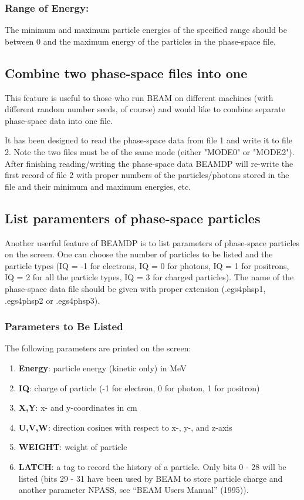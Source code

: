 \documentclass[12pt,twoside]{article}
\begin{document}
\subsubsection{Range of Energy:}
The minimum and maximum particle energies of the specified range
should be between 0 and the maximum energy of the particles in the
phase-space file.

\subsection{Combine two phase-space files into one}

This feature is useful to those who run BEAM on different machines (with
different random number seeds, of course) and would like to combine
separate phase-space data into one file.


It has been designed to read the phase-space data from file 1 and write it
to file 2. Note the two files must be of the same mode (either "MODE0" or
"MODE2"). After finishing reading/writing the phase-space data BEAMDP will
re-write the  first record of file 2 with proper numbers of the
particles/photons stored in the file and their minimum and maximum
energies, etc.

\subsection{ List paramenters of phase-space particles}
Another userful feature of BEAMDP is to list parameters of phase-space
particles on the screen. One can choose the number of particles to be
listed and the particle types (IQ = -1 for electrons, IQ = 0 for photons,
IQ = 1 for positrons, IQ = 2 for all the particle types, IQ = 3 for
charged particles). The name of the phase-space data file should be given
with proper extension (.egs4phsp1, .egs4phsp2 or .egs4phsp3).

\subsubsection{Parameters to Be Listed}

The following parameters are printed on the screen:
\begin{enumerate}
\item {\bf Energy}: particle energy (kinetic only) in MeV

\item {\bf IQ}: charge of particle (-1 for electron, 0 for photon, 1 for
positron)

\item {\bf X,Y}: x- and y-coordinates in cm

\item {\bf U,V,W}: direction cosines with respect to x-, y-, and z-axis

\item {\bf WEIGHT}: weight of particle

\item {\bf LATCH}: a tag to record the history of a particle. Only bits 0
- 28 will be listed (bits 29 - 31 have been used by BEAM to store particle
charge and another parameter NPASS, see ``BEAM Users Manual'' (1995)).
\end{enumerate}
\end{document}
